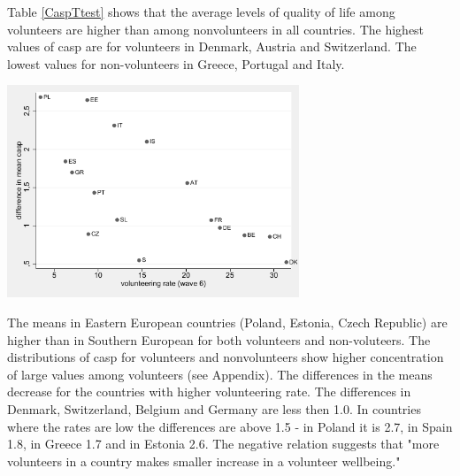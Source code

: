 \documentclass[10pt, letterpaper]{article}
\begin{document}
\begin{spacing}{1.4}
Table \ref{CaspTtest} shows that the average levels of quality of life among volunteers are higher than among nonvolunteers in all countries. The highest values of casp are for volunteers in Denmark, Austria and Switzerland. The lowest values for non-volunteers in Greece, Portugal and Italy.


%	 


\begin{table}[H]
\begin{minipage}[b]{0.56\linewidth}
\centering
\begin{spacing}{.9}
\centering 
\begin{scriptsize} 
	 
      \label{CaspTtest} 
\end{scriptsize}
\end{spacing}
    \label{table:student}
\end{minipage}\hfill
\begin{minipage}[b]{0.4\linewidth}
\centering
{}
\includegraphics[height=2.5in]{abs_casp.pdf}
\label{fig:casp}
\end{minipage}
\end{table}


The means in Eastern European countries (Poland, Estonia, Czech Republic) are higher than in Southern European for both volunteers and non-voluteers. The distributions of casp for volunteers and nonvolunteers show higher concentration of large values among volunteers (see Appendix). The differences in the means decrease for the countries with higher volunteering rate.  The differences in  Denmark, Switzerland, Belgium and Germany are less then 1.0. In countries where the rates are low the differences are above 1.5 - in Poland it is 2.7, in Spain 1.8, in Greece 1.7 and in Estonia 2.6. The negative relation suggests that "more volunteers in a country makes smaller increase in a volunteer wellbeing." 


\end{spacing}
\end{document}
